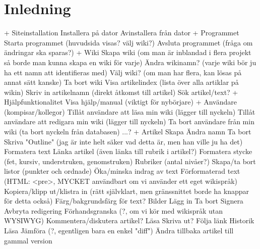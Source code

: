 \section{Inledning}
+ Siteinstallation
    Installera på dator
    Avinstallera från dator
    + Programmet
        Starta programmet (huvudsida visas? välj wiki?)
        Avsluta programmet (fråga om ändringar ska sparas?)
        + Wiki
            Skapa wiki (om man är inblandad i flera projekt så borde man kunna skapa en wiki för varje)
            Ändra wikinamn? (varje wiki bör ju ha ett namn att identifieras med)
            Välj wiki? (om man har flera, kan lösas på annat sätt kanske)
            Ta bort wiki
            Visa artikelindex (lista över alla artiklar på wikin)
            Skriv in artikelnamn (direkt åtkomst till artikel)
            Sök artikel/text?
            + Hjälpfunktionalitet
                Visa hjälp/manual (viktigt för nybörjare)
            + Användare (kompisar/kollegor)
                Tillåt användare att läsa min wiki (lägger till nyckeln)
                Tillåt användare att redigara min wiki (lägger till nyckeln)
                Ta bort användare från min wiki (ta bort nyckeln från databasen)
                ...?
            + Artikel
                Skapa
                Ändra namn
                Ta bort
                Skriva
                    "Outline" (jag är inte helt säker vad detta är, men han ville ju ha det)
                    Formatera text
                        Länka artikel (även länka till rubrik i artikel?)
                        Formatera stycke (fet, kursiv, understruken, genomstruken)
                        Rubriker (antal nivåer?)
                        Skapa/ta bort listor (punkter och ordnade)
                        Öka/minska indrag av text
                        Förformaterad text (HTML: <pre>, MYCKET användbart om vi använder ett eget wikispråk)
                        Kopiera/klipp ut/klistra in (rätt självklart, men gränssnittet borde ha knappar för detta också)
                        Färg/bakgrundsfärg för text?
                    Bilder
                        Lägg in
                        Ta bort
                    Signera
                    Avbryta redigering
                    Förhandsgranska (?, om vi kör med wikispråk utan WYSIWYG)
                    Kommentera/diskutera artikel?
                Läsa
                    Skriva ut?
                    Följa länk
                Historik
                    Läsa
                    Jämföra (?, egentligen bara en enkel "diff")
                    Ändra tillbaka artikel till gammal version


